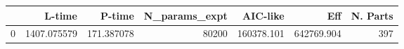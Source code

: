\begin{tabular}{lrrrrrr}
\toprule
{} &       L-time &      P-time &  N\_params\_expt &    AIC-like &         Eff &  N. Parts \\
\midrule
0 &  1407.075579 &  171.387078 &          80200 &  160378.101 &  642769.904 &       397 \\
\bottomrule
\end{tabular}
